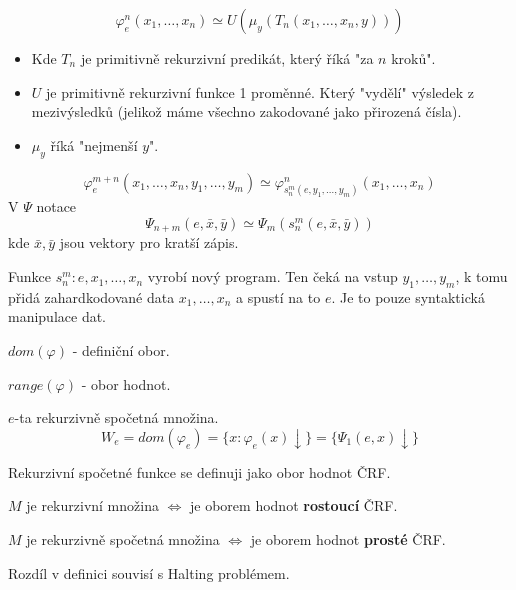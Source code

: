 \begin{notation}
	\[ \varphi_e^n(x_1, \ldots, x_n) \simeq U(\mu_y(T_n(x_1, \ldots, x_n, y))) \]

	\begin{itemize}
		\item Kde $T_n$ je primitivně rekurzivní predikát, který říká "za $n$ kroků".
		\item $U$ je primitivně rekurzivní funkce 1 proměnné.
			Který "vydělí" výsledek z mezivýsledků (jelikož máme všechno zakodované jako přirozená čísla).
		\item $\mu_y$ říká "nejmenší $y$".
	\end{itemize}
\end{notation}

\begin{theorem}[s-m-n (BD)]\label{s_m_n}
	\[ \varphi_e^{m + n}(x_1, \ldots, x_n, y_1, \ldots, y_m) \simeq \varphi_{s_n^m(e, y_1, \ldots, y_m)}^n(x_1, \ldots, x_n) \]
	V $\Psi$ notace
	\[ \Psi_{n + m}(e, \bar{x}, \bar{y}) \simeq \Psi_m(s_n^m(e, \bar{x}, \bar{y})) \]
	kde $\bar{x}, \bar{y}$ jsou vektory pro kratší zápis.

	Funkce $s_n^m: e, x_1, \ldots, x_n$ vyrobí nový program.
	Ten čeká na vstup $y_1, \ldots, y_m$, k tomu přidá zahardkodované data $x_1, \ldots, x_n$ a spustí na to $e$.
	Je to pouze syntaktická manipulace dat.
\end{theorem}

\begin{notation}
	$dom(\varphi)$ - definiční obor.
\end{notation}
\begin{notation}
	$range(\varphi)$ - obor hodnot.
\end{notation}

\begin{definition}
	$e$-ta rekurzivně spočetná množina.
	\[ W_e = dom(\varphi_e) = \{ x: \varphi_e(x) \downarrow \} = \{ \Psi_1(e, x) \downarrow \} \]
\end{definition}

\begin{note}
	Rekurzivní spočetné funkce se definuji jako obor hodnot ČRF.

	$M$ je rekurzivní množina $\iff$ je oborem hodnot \textbf{rostoucí} ČRF.

	$M$ je rekurzivně spočetná množina $\iff$ je oborem hodnot \textbf{prosté} ČRF.

	Rozdíl v definici souvisí s Halting problémem.
\end{note}

